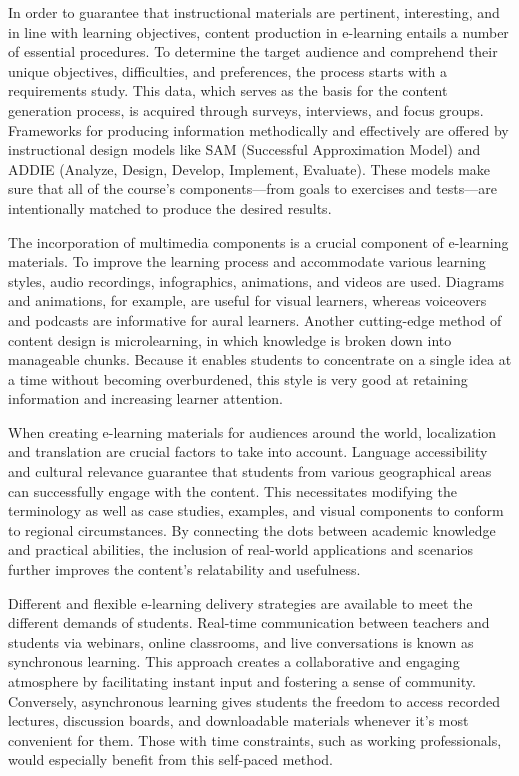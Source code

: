 \documentclass[BTech]{audiss}
\begin{document}
In order to guarantee that instructional materials are pertinent, interesting, and in line with learning objectives, content production in e-learning entails a number of essential procedures. To determine the target audience and comprehend their unique objectives, difficulties, and preferences, the process starts with a requirements study. This data, which serves as the basis for the content generation process, is acquired through surveys, interviews, and focus groups. Frameworks for producing information methodically and effectively are offered by instructional design models like SAM (Successful Approximation Model) and ADDIE (Analyze, Design, Develop, Implement, Evaluate). These models make sure that all of the course's components---from goals to exercises and tests---are intentionally matched to produce the desired results.

The incorporation of multimedia components is a crucial component of e-learning materials. To improve the learning process and accommodate various learning styles, audio recordings, infographics, animations, and videos are used. Diagrams and animations, for example, are useful for visual learners, whereas voiceovers and podcasts are informative for aural learners. Another cutting-edge method of content design is microlearning, in which knowledge is broken down into manageable chunks. Because it enables students to concentrate on a single idea at a time without becoming overburdened, this style is very good at retaining information and increasing learner attention.

When creating e-learning materials for audiences around the world, localization and translation are crucial factors to take into account. Language accessibility and cultural relevance guarantee that students from various geographical areas can successfully engage with the content. This necessitates modifying the terminology as well as case studies, examples, and visual components to conform to regional circumstances. By connecting the dots between academic knowledge and practical abilities, the inclusion of real-world applications and scenarios further improves the content's relatability and usefulness.

Different and flexible e-learning delivery strategies are available to meet the different demands of students. Real-time communication between teachers and students via webinars, online classrooms, and live conversations is known as synchronous learning. This approach creates a collaborative and engaging atmosphere by facilitating instant input and fostering a sense of community. Conversely, asynchronous learning gives students the freedom to access recorded lectures, discussion boards, and downloadable materials whenever it's most convenient for them. Those with time constraints, such as working professionals, would especially benefit from this self-paced method.
\end{document}
